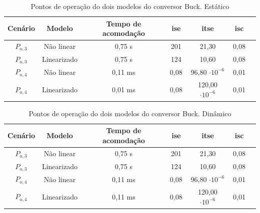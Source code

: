 \vspace{8pt}
\begin{table}[H]
  \centering
  \setlength{\tabcolsep}{10pt}
  \begin{tabular}{ccccccc}
    \toprule
    Cenário & Modelo      & Tempo de acomodação & \acrshort{ise} & \acrshort{itse}        & \acrshort{isc} \\
    \midrule
    $P_{\mathrm{o}, 3}$       & Não linear  & 0,75 s              & 201            & 21,30                  & 0,08           \\
    $P_{\mathrm{o}, 3}$       & Linearizado & 0,75 s              & 124            & 10,60                  & 0,08           \\
    $P_{\mathrm{o}, 4}$       & Não linear  & 0,11 ms             & 0,08           & 96,80 $\cdot 10^{-6}$  & 0,01           \\
    $P_{\mathrm{o}, 4}$       & Linearizado & 0,01 ms             & 0,08           & 120,00 $\cdot 10^{-6}$ & 0,01           \\
    \bottomrule
  \end{tabular}
  \caption{Pontos de operação do dois modelos do conversor Buck. Estático}
  \label{table:indices_desempenho_etm_estático_boost}
\end{table}

\vspace{8pt}
\begin{table}[H]
  \centering
  \setlength{\tabcolsep}{10pt}
  \begin{tabular}{ccccccc}
    \toprule
    Cenário & Modelo      & Tempo de acomodação & \acrshort{ise} & \acrshort{itse}        & \acrshort{isc} \\
    \midrule
    $P_{\mathrm{o}, 3}$       & Não linear  & 0,75 s              & 201            & 21,30                  & 0,08           \\
    $P_{\mathrm{o}, 3}$       & Linearizado & 0,75 s              & 124            & 10,60                  & 0,08           \\
    $P_{\mathrm{o}, 4}$       & Não linear  & 0,11 ms             & 0,08           & 96,80 $\cdot 10^{-6}$  & 0,01           \\
    $P_{\mathrm{o}, 4}$       & Linearizado & 0,11 ms             & 0,08           & 120,00 $\cdot 10^{-6}$ & 0,01           \\
    \bottomrule
  \end{tabular}
  \caption{Pontos de operação do dois modelos do conversor Buck. Dinâmico}
  \label{table:indices_desempenho_etm_dinamico_boost}
\end{table}
